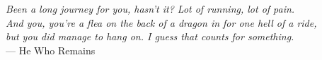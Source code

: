 \documentclass[../thesis.tex]{subfiles}
\begin{document}
	\newpage
	\null
	\vfill

\begin{comment}
	
To be yourself in a world that is constantly trying to \\ make you something else is the greatest accomplishment. \\ 
--- Ralph Waldo Emerson
		
The reason anyone would do this, if they could, which they can't, \\ 
would be because they could, which they can't. \\
--- Pickle Rick

THE CIRCLE IS NOW COMPLETE.\\
--- Darth Vader

Neo: I know kung fu. \\
Morpheus: Show me.

\end{comment}
	
	\begin{flushright}
	
	\textit{
		Been a long journey for you, hasn't it? Lot of running, lot of pain. \\
		And you, you're a flea on the back of a dragon in for one hell of a ride, \\
		but you did manage to hang on. I guess that counts for something.} \\ 
		--- He Who Remains
	
\end{flushright}
	
	\vspace{4cm}
	
	\thispagestyle{empty}	
\end{document}
